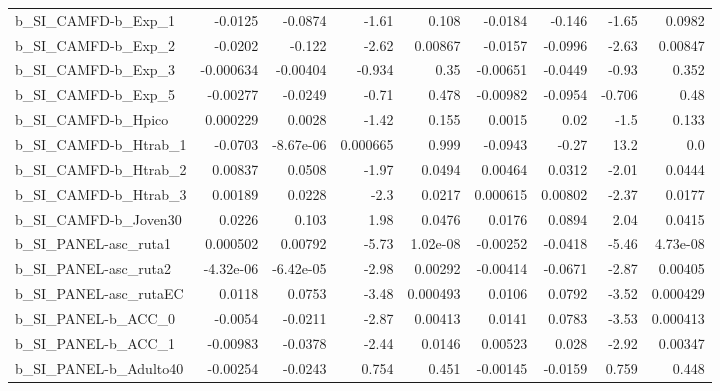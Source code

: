\begin{tabular}{lrrrrrrrr}
b\_SI\_CAMFD-b\_Exp\_1         &     -0.0125 &      -0.0874 &     -1.61 &    0.108 &    -0.0184 &      -0.146 &        -1.65 &        0.0982 \\
b\_SI\_CAMFD-b\_Exp\_2         &     -0.0202 &       -0.122 &     -2.62 &  0.00867 &    -0.0157 &     -0.0996 &        -2.63 &       0.00847 \\
b\_SI\_CAMFD-b\_Exp\_3         &   -0.000634 &     -0.00404 &    -0.934 &     0.35 &   -0.00651 &     -0.0449 &        -0.93 &         0.352 \\
b\_SI\_CAMFD-b\_Exp\_5         &    -0.00277 &      -0.0249 &     -0.71 &    0.478 &   -0.00982 &     -0.0954 &       -0.706 &          0.48 \\
b\_SI\_CAMFD-b\_Hpico         &    0.000229 &       0.0028 &     -1.42 &    0.155 &     0.0015 &        0.02 &         -1.5 &         0.133 \\
b\_SI\_CAMFD-b\_Htrab\_1       &     -0.0703 &    -8.67e-06 &  0.000665 &    0.999 &    -0.0943 &       -0.27 &         13.2 &           0.0 \\
b\_SI\_CAMFD-b\_Htrab\_2       &     0.00837 &       0.0508 &     -1.97 &   0.0494 &    0.00464 &      0.0312 &        -2.01 &        0.0444 \\
b\_SI\_CAMFD-b\_Htrab\_3       &     0.00189 &       0.0228 &      -2.3 &   0.0217 &   0.000615 &     0.00802 &        -2.37 &        0.0177 \\
b\_SI\_CAMFD-b\_Joven30       &      0.0226 &        0.103 &      1.98 &   0.0476 &     0.0176 &      0.0894 &         2.04 &        0.0415 \\
b\_SI\_PANEL-asc\_ruta1       &    0.000502 &      0.00792 &     -5.73 & 1.02e-08 &   -0.00252 &     -0.0418 &        -5.46 &      4.73e-08 \\
b\_SI\_PANEL-asc\_ruta2       &   -4.32e-06 &    -6.42e-05 &     -2.98 &  0.00292 &   -0.00414 &     -0.0671 &        -2.87 &       0.00405 \\
b\_SI\_PANEL-asc\_rutaEC      &      0.0118 &       0.0753 &     -3.48 & 0.000493 &     0.0106 &      0.0792 &        -3.52 &      0.000429 \\
b\_SI\_PANEL-b\_ACC\_0         &     -0.0054 &      -0.0211 &     -2.87 &  0.00413 &     0.0141 &      0.0783 &        -3.53 &      0.000413 \\
b\_SI\_PANEL-b\_ACC\_1         &    -0.00983 &      -0.0378 &     -2.44 &   0.0146 &    0.00523 &       0.028 &        -2.92 &       0.00347 \\
b\_SI\_PANEL-b\_Adulto40      &    -0.00254 &      -0.0243 &     0.754 &    0.451 &   -0.00145 &     -0.0159 &        0.759 &         0.448 \\

\end{tabular}

